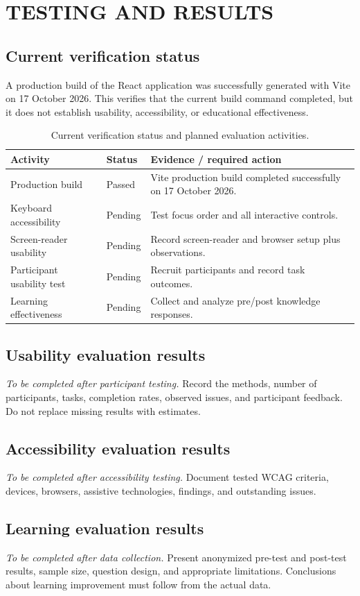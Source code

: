\chapter{TESTING AND RESULTS}
\section{Current verification status}
A production build of the React application was successfully generated with Vite on 17 October 2026. This verifies that the current build command completed, but it does not establish usability, accessibility, or educational effectiveness.

\begin{table}[htbp]
\centering
\caption{Current verification status and planned evaluation activities.}
\label{tab:verification}
\begin{tabularx}{\textwidth}{|X|p{3cm}|X|}
\hline
\textbf{Activity} & \textbf{Status} & \textbf{Evidence / required action}\\ \hline
Production build & Passed & Vite production build completed successfully on 17 October 2026.\\ \hline
Keyboard accessibility & Pending & Test focus order and all interactive controls.\\ \hline
Screen-reader usability & Pending & Record screen-reader and browser setup plus observations.\\ \hline
Participant usability test & Pending & Recruit participants and record task outcomes.\\ \hline
Learning effectiveness & Pending & Collect and analyze pre/post knowledge responses.\\ \hline
\end{tabularx}
\end{table}

\section{Usability evaluation results}
\textit{To be completed after participant testing.} Record the methods, number of participants, tasks, completion rates, observed issues, and participant feedback. Do not replace missing results with estimates.

\section{Accessibility evaluation results}
\textit{To be completed after accessibility testing.} Document tested WCAG criteria, devices, browsers, assistive technologies, findings, and outstanding issues.

\section{Learning evaluation results}
\textit{To be completed after data collection.} Present anonymized pre-test and post-test results, sample size, question design, and appropriate limitations. Conclusions about learning improvement must follow from the actual data.
